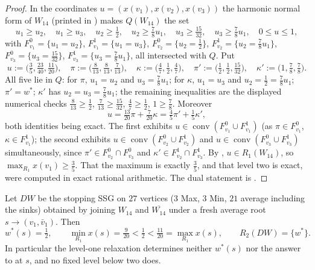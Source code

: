 \begin{proof}
In the coordinates $u=(x(v_1),x(v_2),x(v_3))$ the harmonic normal form of
$W_{14}$ (printed in ) makes $Q(W_{14})$ the set
\[
  u_1\ge u_2,\quad u_1\ge u_3,\quad u_2\ge\tfrac12,\quad u_2\ge\tfrac78u_1,
  \quad u_3\ge\tfrac{15}{32},\quad u_3\ge\tfrac78u_1,\quad 0\le u\le1 ,
\]
with $F_{v_1}^{0}=\{u_1=u_2\}$, $F_{v_1}^{1}=\{u_1=u_3\}$,
$F_{v_2}^{0}=\{u_2=\frac12\}$, $F_{v_2}^{1}=\{u_2=\frac78u_1\}$,
$F_{v_3}^{0}=\{u_3=\frac{15}{32}\}$, $F_{v_3}^{1}=\{u_3=\frac78u_1\}$, all
intersected with $Q$. Put
\[
  u:=\bigl(\tfrac35,\tfrac{23}{40},\tfrac{11}{20}\bigr),\quad
  \pi:=\bigl(\tfrac8{13},\tfrac8{13},\tfrac7{13}\bigr),\quad
  \kappa:=\bigl(\tfrac47,\tfrac12,\tfrac47\bigr),\quad
  \pi':=\bigl(\tfrac12,\tfrac12,\tfrac{15}{32}\bigr),\quad
  \kappa':=\bigl(1,\tfrac78,\tfrac78\bigr).
\]
All five lie in $Q$: for $\pi$, $u_1=u_2$ and $u_3=\frac78u_1$;
for $\kappa$, $u_1=u_3$ and $u_2=\frac12=\frac78u_1$; $\pi'=w^{\ast}$;
$\kappa'$ has $u_2=u_3=\frac78u_1$; the remaining inequalities are the
displayed numerical checks $\frac8{13}\ge\frac12$, $\frac7{13}\ge\frac{15}{32}$,
$\frac47\ge\frac12$, $1\ge\frac78$. Moreover
\[
  u=\tfrac{13}{20}\pi+\tfrac7{20}\kappa
   =\tfrac45\pi'+\tfrac15\kappa' ,
\]
both identities being exact. The first exhibits $u\in\operatorname{conv}
(F_{v_1}^{0}\cup F_{v_1}^{1})$ (as $\pi\in F_{v_1}^{0}$,
$\kappa\in F_{v_1}^{1}$); the second exhibits
$u\in\operatorname{conv}(F_{v_2}^{0}\cup F_{v_2}^{1})$ and
$u\in\operatorname{conv}(F_{v_3}^{0}\cup F_{v_3}^{1})$ simultaneously, since
$\pi'\in F_{v_2}^{0}\cap F_{v_3}^{0}$ and
$\kappa'\in F_{v_2}^{1}\cap F_{v_3}^{1}$. By ,
$u\in R_1(W_{14})$, so $\max_{R_1}x(v_1)\ge\frac35$. That the maximum is
exactly $\frac35$, and that level two is exact, were computed in exact rational
arithmetic. The dual statement is .
\end{proof}

\begin{theorem}
\label{cl:dw}
Let $DW$ be the stopping SSG on $27$ vertices ($3$ Max, $3$ Min, $21$ average
including the sinks) obtained by joining $W_{14}$ and $\overline{W_{14}}$ under
a fresh average root $s\to(v_1,\bar v_1)$. Then
\[
  w^{\ast}(s)=\tfrac12,\qquad
  \min_{R_1}x(s)=\tfrac9{20}<\tfrac12<\tfrac{11}{20}=\max_{R_1}x(s),
  \qquad R_2(DW)=\{w^{\ast}\}.
\]
In particular the level-one relaxation determines neither $w^{\ast}(s)$ nor the
answer to  at $s$, and no fixed level below two does.
\end{theorem}


